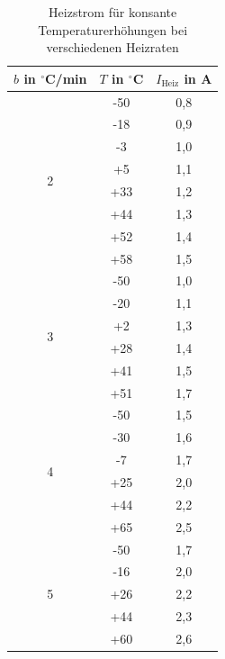 \begin{table}[H]
 \begin{tabular}{c|c|c}
 $b$ in $^\circ$C/min & $T$ in $^\circ$C & $I_\text{Heiz}$ in A\\
 \hline
 \multirow{8}{0mm}{2} &-50&0,8\\
 &-18 & 0,9\\
 &-3 & 1,0 \\
 &+5 & 1,1 \\
 &+33 & 1,2 \\
 &+44 & 1,3 \\
 &+52 & 1,4 \\
 &+58 & 1,5 \\
 \hline
 \multirow{6}{0mm}{3} &-50&1,0\\
 &-20&1,1\\
 &+2&1,3\\
 &+28&1,4\\
 &+41&1,5\\
 &+51&1,7\\
 \hline
 \multirow{6}{0mm}{4} &-50&1,5\\
 &-30&1,6\\
 &-7&1,7\\
 &+25&2,0\\
 &+44&2,2\\
 &+65&2,5\\
 \hline
 \multirow{6}{0mm}{5} &-50&1,7\\
 &-16&2,0\\
 &+26&2,2\\
 &+44&2,3\\
 &+60&2,6\\ 
 \end{tabular}
\caption{Heizstrom für konsante Temperaturerhöhungen bei verschiedenen Heizraten}
\label{tab_heizrate}
\end{table}

